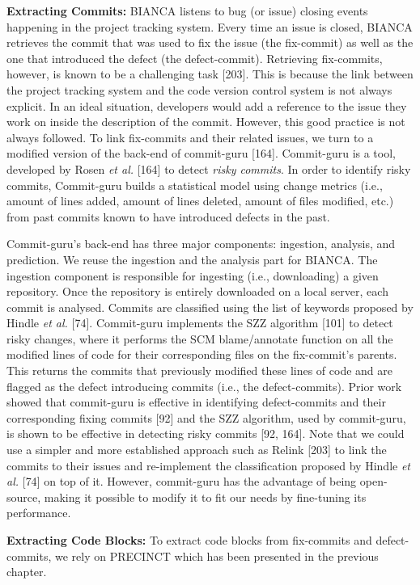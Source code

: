 \documentclass[12pt]{report}
\begin{document}
\textbf{Extracting Commits:} BIANCA listens to bug (or issue) closing
events happening in the project tracking system. Every time an issue is
closed, BIANCA retrieves the commit that was used to fix the issue (the
fix-commit) as well as the one that introduced the defect (the
defect-commit). Retrieving fix-commits, however, is known to be a
challenging task {[}203{]}. This is because the link between the project
tracking system and the code version control system is not always
explicit. In an ideal situation, developers would add a reference to the
issue they work on inside the description of the commit. However, this
good practice is not always followed. To link fix-commits and their
related issues, we turn to a modified version of the back-end of
commit-guru {[}164{]}. Commit-guru is a tool, developed by Rosen
\emph{et al.} {[}164{]} to detect \emph{risky commits}. In order to
identify risky commits, Commit-guru builds a statistical model using
change metrics (i.e., amount of lines added, amount of lines deleted,
amount of files modified, etc.) from past commits known to have
introduced defects in the past.

Commit-guru's back-end has three major components: ingestion, analysis,
and prediction. We reuse the ingestion and the analysis part for BIANCA.
The ingestion component is responsible for ingesting (i.e., downloading)
a given repository. Once the repository is entirely downloaded on a
local server, each commit is analysed. Commits are classified using the
list of keywords proposed by Hindle \emph{et al.} {[}74{]}. Commit-guru
implements the SZZ algorithm {[}101{]} to detect risky changes, where it
performs the SCM blame/annotate function on all the modified lines of
code for their corresponding files on the fix-commit's parents. This
returns the commits that previously modified these lines of code and are
flagged as the defect introducing commits (i.e., the defect-commits).
Prior work showed that commit-guru is effective in identifying
defect-commits and their corresponding fixing commits {[}92{]} and the
SZZ algorithm, used by commit-guru, is shown to be effective in
detecting risky commits {[}92, 164{]}. Note that we could use a simpler
and more established approach such as Relink {[}203{]} to link the
commits to their issues and re-implement the classification proposed by
Hindle \emph{et al.} {[}74{]} on top of it. However, commit-guru has the
advantage of being open-source, making it possible to modify it to fit
our needs by fine-tuning its performance.

\textbf{Extracting Code Blocks:} To extract code blocks from fix-commits
and defect-commits, we rely on PRECINCT which has been presented in the
previous chapter.
\end{document}
